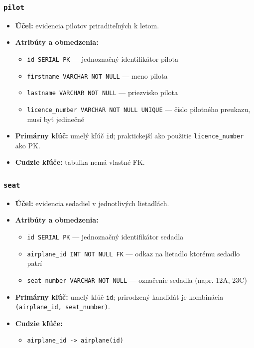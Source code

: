 \documentclass[11pt, a4paper]{article}
\begin{document}
\subsubsection*{\texttt{pilot}}
\begin{itemize}
    \item \textbf{Účel:} evidencia pilotov priraditeľných k letom.
    \item \textbf{Atribúty a obmedzenia:}
    \begin{itemize}
        \item \texttt{id SERIAL PK} --- jednoznačný identifikátor pilota
        \item \texttt{firstname VARCHAR NOT NULL} --- meno pilota
        \item \texttt{lastname VARCHAR NOT NULL} --- priezvisko pilota
        \item \texttt{licence\_number VARCHAR NOT NULL UNIQUE} --- číslo pilotného preukazu, musí byť jedinečné
    \end{itemize}
    \item \textbf{Primárny kľúč:} umelý kľúč \texttt{id}; praktickejší ako použitie
        \texttt{licence\_number} ako PK.
    \item \textbf{Cudzie kľúče:} tabuľka nemá vlastné FK.
\end{itemize}

\subsubsection*{\texttt{seat}}
\begin{itemize}
    \item \textbf{Účel:} evidencia sedadiel v jednotlivých lietadlách.
    \item \textbf{Atribúty a obmedzenia:}
    \begin{itemize}
        \item \texttt{id SERIAL PK} --- jednoznačný identifikátor sedadla
        \item \texttt{airplane\_id INT NOT NULL FK} --- odkaz na lietadlo ktorému sedadlo patrí
        \item \texttt{seat\_number VARCHAR NOT NULL} --- označenie sedadla (napr. 12A, 23C)
    \end{itemize}
    \item \textbf{Primárny kľúč:} umelý kľúč \texttt{id}; prirodzený kandidát je kombinácia
        \texttt{(airplane\_id, seat\_number)}.
    \item \textbf{Cudzie kľúče:} 
        \begin{itemize}
            \item \texttt{airplane\_id -> airplane(id)}
        \end{itemize}
\end{itemize}
\end{document}
